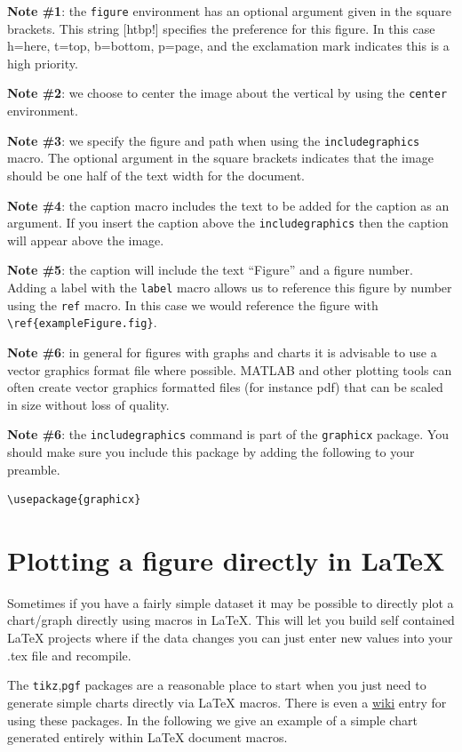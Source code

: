 {\bf Note \#1}: the \texttt{figure} environment has an optional argument given in the square brackets. This string [htbp!] specifies the preference for this figure. In this case h=here, t=top, b=bottom, p=page, and the exclamation mark indicates this is a high priority.

{\bf Note \#2}: we choose to center the image about the vertical by using the \texttt{center} environment.

{\bf Note \#3}: we specify the figure and path when using the \texttt{includegraphics} macro. The optional argument in the square brackets indicates that the image should be one half of the text width for the document.

{\bf Note \#4}: the caption macro includes the text to be added for the caption as an argument. If you insert the caption above the \texttt{includegraphics} then the caption will appear above the image.

{\bf Note \#5}: the caption will include the text ``Figure'' and a figure number. Adding a label with the \texttt{label} macro allows us to reference this figure by number using the \texttt{ref} macro. In this case we would reference the figure with \verb|\ref{exampleFigure.fig}|.

{\bf Note \#6}: in general for figures with graphs and charts it is advisable to use a vector graphics format file where possible. MATLAB and other plotting tools can often create vector graphics formatted files (for instance pdf) that can be scaled in size without loss of quality.

{\bf Note \#6}: the \texttt{includegraphics} command is part of the \texttt{graphicx} package. You should make sure you include this package by adding the following to your preamble.

\begin{verbatim}
\usepackage{graphicx}
\end{verbatim}

\section{Plotting a figure directly in \LaTeX{}}

Sometimes if you have a fairly simple dataset it may be possible to directly plot a chart/graph directly using macros in \LaTeX{}. This will let you build self contained \LaTeX{} projects where if the data changes you can just enter new values into your .tex file and recompile. 

The \texttt{tikz},\texttt{pgf} packages are a reasonable place to start when you just need to generate simple charts directly via \LaTeX{} macros. There is even a \href{https://en.wikipedia.org/wiki/PGF/TikZ}{wiki} entry for using these packages. In the following we give an example of a simple chart generated entirely within \LaTeX{} document macros.

